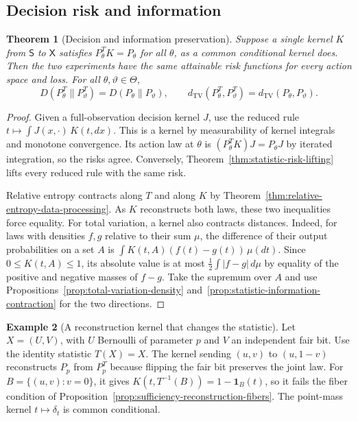 \documentclass[11pt,oneside]{book}
\newtheorem{theorem}{Theorem}[chapter]
\theoremstyle{definition}
\newtheorem{example}[theorem]{Example}
\theoremstyle{remark}
\begin{document}
\subsection{Decision risk and information}
\label{subsec:sufficiency-decision-information}

\begin{theorem}[Decision and information preservation]
\label{thm:sufficiency-risk-information}
Suppose a single kernel $K$ from $\mathsf S$ to $\mathsf X$
satisfies $P_\theta^T K=P_\theta$ for all $\theta$, as a common
conditional kernel does. Then the two experiments have the same
attainable risk functions for every action space and loss.
For all $\theta,\vartheta\in\Theta$,
\[
D(P_\theta^T\|P_\vartheta^T)=D(P_\theta\|P_\vartheta),\qquad
d_{\mathrm{TV}}(P_\theta^T,P_\vartheta^T)
=d_{\mathrm{TV}}(P_\theta,P_\vartheta).
\]
\end{theorem}
\begin{proof}
Given a full-observation decision kernel $J$, use the reduced
rule $t\mapsto\int J(x,\cdot)\,K(t,dx)$. This is a kernel by
measurability of kernel integrals and monotone convergence.
Its action law at $\theta$ is $(P_\theta^T K)J=P_\theta J$ by
iterated integration, so the risks agree. Conversely,
Theorem~\ref{thm:statistic-risk-lifting} lifts every reduced rule
with the same risk.

Relative entropy contracts along $T$ and along $K$ by
Theorem~\ref{thm:relative-entropy-data-processing}. As $K$
reconstructs both laws, these two inequalities force equality.
For total variation, a kernel also contracts distances.
Indeed, for laws with densities $f,g$ relative to their sum $\mu$,
the difference of their output probabilities on a set $A$ is
$\int K(t,A)(f(t)-g(t))\,\mu(dt)$. Since $0\leq K(t,A)\leq1$,
its absolute value is at most
$\tfrac12\int |f-g|\,d\mu$ by equality of the positive and negative
masses of $f-g$. Take the supremum over $A$ and use
Propositions~\ref{prop:total-variation-density}
and~\ref{prop:statistic-information-contraction} for the two directions.
\end{proof}

\begin{example}[A reconstruction kernel that changes the statistic]
\label{ex:sufficiency-reconstruction-without-fibers}
Let $X=(U,V)$, with $U$ Bernoulli of parameter $p$ and $V$ an
independent fair bit. Use the identity statistic $T(X)=X$.
The kernel sending $(u,v)$ to $(u,1-v)$ reconstructs $P_p$
from $P_p^T$ because flipping the fair bit preserves the joint law.
For $B=\{(u,v):v=0\}$, it gives
$K(t,T^{-1}(B))=1-\mathbf 1_B(t)$, so it fails the fiber condition
of Proposition~\ref{prop:sufficiency-reconstruction-fibers}.
The point-mass kernel $t\mapsto\delta_t$ is common conditional.
\end{example}
\end{document}
